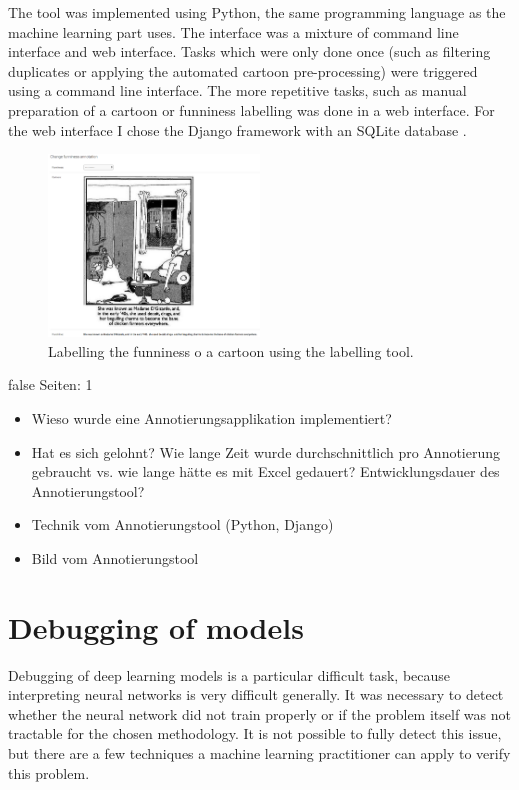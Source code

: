 \documentclass[draft,final,oneside]{vutinfth} %
\begin{document}
The tool was implemented using Python, the same programming language as the machine learning part uses. The interface was a mixture of command line interface and web interface. Tasks which were only done once (such as filtering duplicates or applying the automated cartoon pre-processing) were triggered using a command line interface. The more repetitive tasks, such as manual preparation of a cartoon or funniness labelling was done in a web interface. For the web interface I chose the Django framework with an SQLite database \cite{django}\cite{sqlite}. 

\begin{figure}
	\centering
  	\includegraphics[width=0.5\textwidth]{graphics/labeling_tool.png}
	\caption{Labelling the funniness o a cartoon using the labelling tool.}
	\label{fig:labellingtool}
\end{figure}

\if false
Seiten: 1

\begin{itemize}
\item Wieso wurde eine Annotierungsapplikation implementiert?
\item Hat es sich gelohnt? Wie lange Zeit wurde durchschnittlich pro Annotierung gebraucht vs. wie lange hätte es mit Excel gedauert? Entwicklungsdauer des Annotierungstool?
\item Technik vom Annotierungstool (Python, Django)
\item Bild vom Annotierungstool
\end{itemize}
\fi


\section{Debugging of models}

Debugging of deep learning models is a particular difficult task, because interpreting neural networks is very difficult generally. It was necessary to detect whether the neural network did not train properly or if the problem itself was not tractable for the chosen methodology. It is not possible to fully detect this issue, but there are a few techniques a machine learning practitioner can apply to verify this problem.
\end{document}

